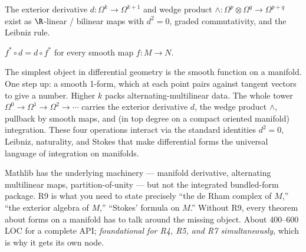 \begin{lemma}
\label{lem:bundled-forms-operations}
The exterior derivative $d : \Omega^{k} \to \Omega^{k+1}$ and wedge product $\wedge : \Omega^{p} \otimes \Omega^{q} \to \Omega^{p+q}$ exist as $\R$-linear / bilinear maps with $d^{2} = 0$, graded commutativity, and the Leibniz rule.
\leanok
\end{lemma}

\begin{lemma}[$d^{2} = 0$]
\label{lem:bundled-forms-d-sq-zero}
\leanok
\end{lemma}

\begin{lemma}
\label{lem:bundled-forms-pullback-compat}
$f^{*} \circ d = d \circ f^{*}$ for every smooth map $f : M \to N$.
\leanok
\end{lemma}

\begin{layman}
The simplest object in differential geometry is the smooth function
on a manifold.  One step up: a smooth 1-form, which at each point
pairs against tangent vectors to give a number.  Higher \(k\) packs
alternating-multilinear data.  The whole tower
\(\Omega^{0} \to \Omega^{1} \to \Omega^{2} \to \cdots\) carries the
exterior derivative \(d\), the wedge product \(\wedge\), pullback by
smooth maps, and (in top degree on a compact oriented manifold)
integration.  These four operations interact via the standard
identities \(d^{2}=0\), Leibniz, naturality, and Stokes that make
differential forms the universal language of integration on
manifolds.

Mathlib has the underlying machinery --- manifold derivative,
alternating multilinear maps, partition-of-unity --- but not the
integrated bundled-form package.  R9 is what you need to state
precisely ``the de Rham complex of \(M\),'' ``the exterior algebra
of \(M\),'' ``Stokes' formula on \(M\).''  Without R9, every theorem
about forms on a manifold has to talk around the missing object.
About 400--600 LOC for a complete API; \emph{foundational for R4, R5,
and R7 simultaneously}, which is why it gets its own node.
\end{layman}

